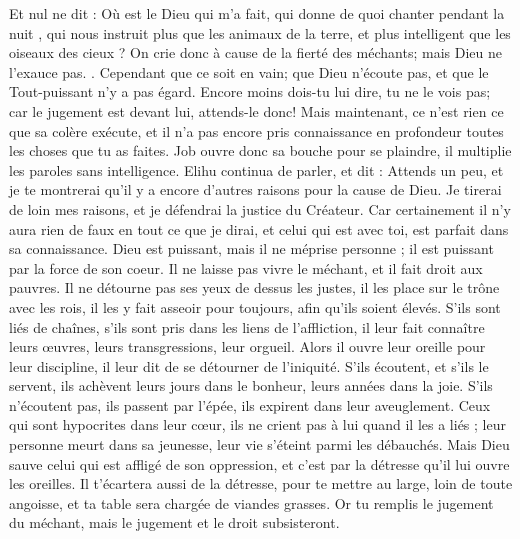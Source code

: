 \begin{multicols}{2}
Et nul ne dit : Où est le Dieu qui m'a fait, qui donne de quoi chanter pendant la nuit ,
qui nous instruit plus que les animaux de la terre, et plus intelligent que les oiseaux des cieux ?
On crie donc à cause de la fierté des méchants; mais Dieu ne l'exauce pas.
.
 Cependant que ce soit en vain; que Dieu n'écoute pas, et que le Tout-puissant n'y a pas égard.
Encore moins dois-tu lui dire, tu ne le vois pas; car le jugement est devant lui, attends-le donc!
Mais maintenant, ce n'est rien ce que sa colère exécute, et il n'a pas encore pris connaissance en profondeur toutes les choses que tu as faites.
Job ouvre donc sa bouche pour se plaindre, il multiplie les paroles sans intelligence.
\VerseOne{}Elihu continua de parler, et dit :
Attends un peu, et je te montrerai qu'il y a encore d'autres raisons pour la cause de Dieu.
Je tirerai de loin mes raisons, et je défendrai la justice du Créateur.
Car certainement il n'y aura rien de faux en tout ce que je dirai, et celui qui est avec toi, est parfait dans sa connaissance.
Dieu est puissant, mais il ne méprise personne ; il est puissant par la force de son coeur.
Il ne laisse pas vivre le méchant, et il fait droit aux pauvres.
Il ne détourne pas ses yeux de dessus les justes, il les place sur le trône avec les rois, il les y fait asseoir pour toujours, afin qu'ils soient élevés.
S'ils sont liés de chaînes, s'ils sont pris dans les liens de l'affliction,
il leur fait connaître leurs œuvres, leurs transgressions, leur orgueil.
Alors il ouvre leur oreille pour leur discipline, il leur dit de se détourner de l'iniquité.
S'ils écoutent, et s'ils le servent, ils achèvent leurs jours dans le bonheur, leurs années dans la joie.
S'ils n'écoutent pas, ils passent par l'épée, ils expirent dans leur aveuglement.
Ceux qui sont hypocrites dans leur cœur, ils ne crient pas à lui quand il les a liés ;
leur personne meurt dans sa jeunesse, leur vie s'éteint parmi les débauchés.
Mais Dieu sauve celui qui est affligé de son oppression, et c'est par la détresse qu'il lui ouvre les oreilles.
Il t'écartera aussi de la détresse, pour te mettre au large, loin de toute angoisse, et ta table sera chargée de viandes grasses.
Or tu remplis le jugement du méchant, mais le jugement et le droit subsisteront.

\end{multicols}

